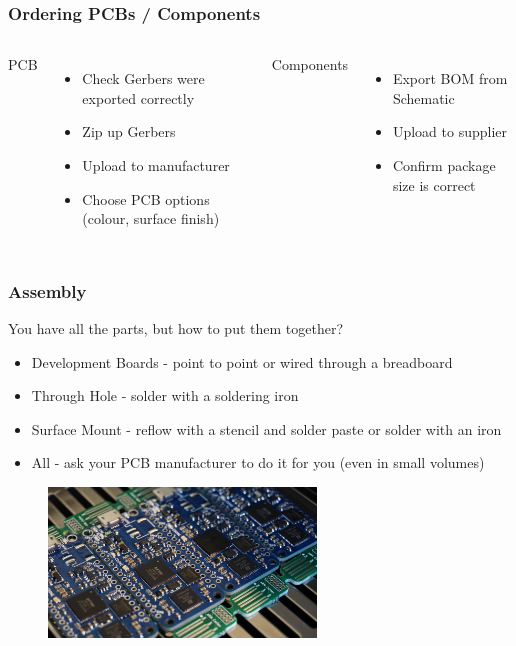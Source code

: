 \documentclass[aspectratio=169, t]{beamer}
\begin{document}
\begin{frame}
\frametitle{Ordering PCBs / Components}
\begin{columns}
	PCB
	\begin{itemize}
		\item Check Gerbers were exported correctly
		\item Zip up Gerbers
		\item Upload to manufacturer
		\item Choose PCB options (colour, surface finish)
	\end{itemize}
	
	Components
	\begin{itemize}
		\item Export BOM from Schematic
		\item Upload to supplier
		\item Confirm package size is correct
	\end{itemize}
	
\end{columns}
\end{frame}

\begin{frame}
\frametitle{Assembly}
You have all the parts, but how to put them together?
\begin{itemize}
	\item Development Boards - point to point or wired through a breadboard
	\item Through Hole - solder with a soldering iron
	\item Surface Mount - reflow with a stencil and solder paste or solder with an iron
	\item All - ask your PCB manufacturer to do it for you (even in small volumes)
\end{itemize}
\begin{figure}
	\includegraphics[height=4cm]{images/ice40-reflow.jpeg}
\end{figure}
\end{frame}
\end{document}
